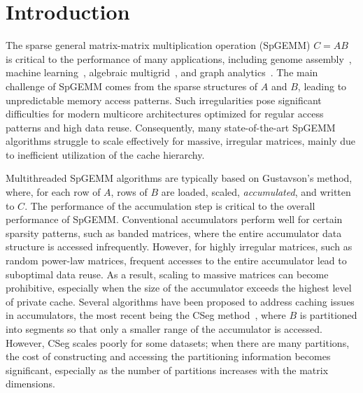 \section{Introduction}
\sloppy The sparse general matrix-matrix multiplication operation (SpGEMM) $C = A B$ is critical to the performance of many applications, including genome assembly~\cite{genome1,genome2,bella}, machine learning~\cite{pca,mcl,dnn,HipMCL,hoefler}, algebraic multigrid~\cite{amg1,amg2}, and graph analytics~\cite{bfs,subgraph,tricount1,tricount2,color,tricount3}.
The main challenge of SpGEMM comes from the sparse structures of $A$ and $B$, leading to unpredictable memory access patterns. Such irregularities pose significant difficulties for modern multicore architectures optimized for regular access patterns and high data reuse. Consequently, many state-of-the-art SpGEMM algorithms struggle to scale effectively for massive, irregular matrices, mainly due to inefficient utilization of the cache hierarchy.

Multithreaded SpGEMM algorithms are typically based on Gustavson's method, where, for each row of $A$, rows of $B$ are loaded, scaled, \emph{accumulated}, and written to $C$. The performance of the accumulation step is critical to the overall performance of SpGEMM. Conventional accumulators perform well for certain sparsity patterns, such as banded matrices, where the entire accumulator data structure is accessed infrequently. However, for highly irregular matrices, such as random power-law matrices, frequent accesses to the entire accumulator lead to suboptimal data reuse. As a result, scaling to massive matrices can become prohibitive, especially when the size of the accumulator exceeds the highest level of private cache.
Several algorithms have been proposed to address caching issues in accumulators, the most recent being the CSeg method~\cite{partway,cseg}, where $B$ is partitioned into segments so that only a smaller range of the accumulator is accessed. However, CSeg scales poorly for some datasets; when there are many partitions, the cost of constructing and accessing the partitioning information becomes significant, especially as the number of partitions increases with the matrix dimensions.

